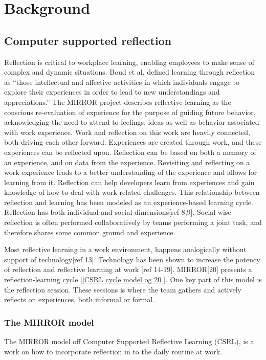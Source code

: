 \chapter{Background}

\section{Computer supported reflection}
Reflection is critical to workplace learning, enabling employees to make sense of complex and dynamic situations\cite{Schon1983}. Boud et al.\cite{boudreflection1985} defined learning through reflection as “those intellectual and affective activities in which individuals engage to explore their experiences in order to lead to new understandings and appreciations.”
The MIRROR project describes reflective learning as the conscious re-evaluation of experience for the purpose of guiding future behavior, acknowledging the need to attend to feelings, ideas as well as behavior associated with work experience\cite{krogstiemodel}.
Work and reflection on this work are heavily connected\cite{Schon1983}, both driving each other forward. Experiences are created through work, and these experiences can be reflected upon. Reflection can be based on both a memory of an experience, and on data from the experience. Revisiting and reflecting on a work experience leads to a better understanding of the experience and allows for learning from it. Reflection can help developers learn from experiences and gain knowledge of how to deal with work-related challenges. This relationship between reflection and learning has been modeled as an experience-based learning cycle\cite{Korthagen_Vasalos_2005, KolbModel}.
Reflection has both individual and social dimensions[ref 8,9]. Social wise reflection is often performed collaboratively by teams performing a joint task, and therefore shares some common ground and experience. 

Most reflective learning in a work environment, happens analogically without support of technology[ref 13]. Technology has been shown to increase the potency of reflection and reflective learning at work [ref 14-19].
MIRROR[20] presents a reflection-learning cycle [\ref{CSRL cycle model og 20 }. One key part of this model is the reflection session. These sessions is where the team gathers and actively reflects on experiences, both informal or formal. 

\subsection{The MIRROR model}
The MIRROR model off Computer Supported Reflective Learning (CSRL), is a work on how to incorporate reflection in to the daily routine at work.

